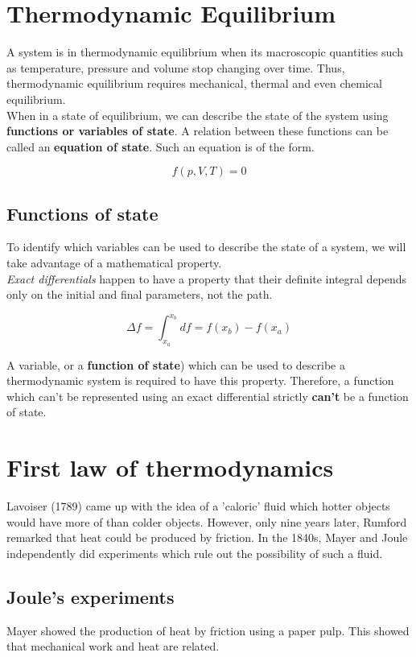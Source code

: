 \documentclass{article}
\begin{document}
	\section{Thermodynamic Equilibrium}
	A system is in thermodynamic equilibrium when its macroscopic quantities such as temperature, pressure and volume stop changing over time. Thus, thermodynamic equilibrium requires mechanical, thermal and even chemical equilibrium.\\
	
	When in a state of equilibrium, we can describe the state of the system using \textbf{functions or variables of state}. A relation between these functions can be called an \textbf{equation of state}. Such an equation is of the form.
	
	$$ f(p,V,T) = 0 $$
	
	\subsection{Functions of state}
	To identify which variables can be used to describe the state of a system, we will take advantage of a mathematical property.\\ \textit{Exact differentials} happen to have a property that their definite integral depends only on the initial and final parameters, not the path.
	
	$$ \Delta f = \int_{x_a}^{x_b} df = f(x_b) - f(x_a)$$ 
	
	A variable, or a \textbf{function of state}) which can be used to describe a thermodynamic system is required to have this property. Therefore, a function which can't be represented using an exact differential strictly \textbf{can't} be a function of state.
	
	\section{First law of thermodynamics}
	Lavoiser (1789) came up with the idea of a 'caloric' fluid which hotter objects would have more of than colder objects. However, only nine years later, Rumford remarked that heat could be produced by friction. In the 1840s, Mayer and Joule independently did experiments which rule out the possibility of such a fluid.
	
	\subsection{Joule's experiments}
	Mayer showed the production of heat by friction using a paper pulp. This showed that mechanical work and heat are related.
	
\end{document}
